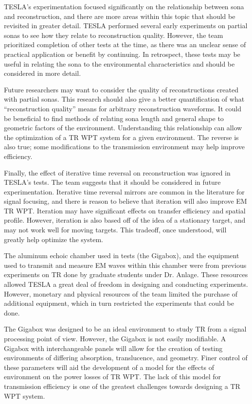 TESLA's experimentation focused significantly on the relationship between sona and reconstruction, and there are more areas within this topic that should be revisited in greater detail.  TESLA performed several early experiments on partial sonas to see how they relate to reconstruction quality.  However, the team prioritized completion of other tests at the time, as there was an unclear sense of practical application or benefit by continuing.  In retrospect, these tests may be useful in relating the sona to the environmental characteristics and should be considered in more detail.

Future researchers may want to consider the quality of reconstructions created with partial sonas.  This research should also give a better quantification of what ``reconstruction quality'' means for arbitrary reconstruction waveforms. It could be beneficial to find methods of relating sona length and general shape to geometric factors of the environment. Understanding this relationship can allow the optimization of a TR WPT system for a given environment. The reverse is also true; some modifications to the transmission environment may help improve efficiency.

Finally, the effect of iterative time reversal on reconstruction was ignored in TESLA's tests.  The team suggests that it should be considered in future experimentation. Iterative time reversal mirrors are common in the literature for signal focusing, and there is reason to believe that iteration will also improve EM TR WPT.  Iteration may have significant effects on transfer efficiency and spatial profile.  However, iteration is also based off of the idea of a stationary target, and may not work well for moving targets.  This tradeoff, once understood, will greatly help optimize the system.

The aluminum echoic chamber used in tests (the Gigabox), and the equipment used to transmit and measure EM waves within this chamber were from previous experiments on TR done by graduate students under Dr. Anlage.  These resources allowed TESLA a great deal of freedom in designing and conducting experiments.  However, monetary and physical resources of the team limited the purchase of additional equipment, which in turn restricted the experiments that could be done. 

The Gigabox was designed to be an ideal environment to study TR from a signal processing point of view. However, the Gigabox is not easily modifiable. A Gigabox with interchangeable panels will allow for the creation of testing environments of differing absorption, translucence, and geometry. Finer control of these parameters will aid the development of a model for the effects of environment on the power losses of TR WPT. The lack of this model for transmission efficiency is one of the greatest challenges towards designing a TR WPT system.

